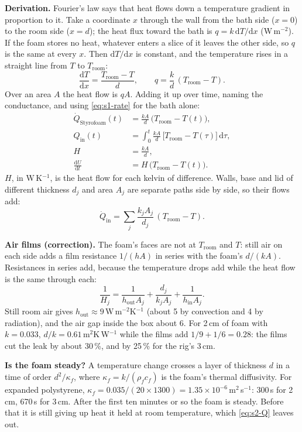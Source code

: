 \documentclass[11pt,a4paper]{article}
\newcommand{\dd}{\mathrm{d}}
\newcommand{\Troom}{T_{\mathrm{room}}}
\newcommand{\para}[1]{\par\smallskip\noindent\textbf{#1}\enspace}
\begin{document}
\para{Derivation.} Fourier's law says that heat flows down a temperature gradient in proportion to it.
Take a coordinate $x$ through the wall from the bath side ($x = 0$) to the room side ($x = d$); the heat
flux toward the bath is $q = k\,\dd T/\dd x$ (W\,m$^{-2}$). If the foam stores no heat, whatever enters a
slice of it leaves the other side, so $q$ is the same at every $x$. Then $\dd T/\dd x$ is constant, and the
temperature rises in a straight line from $T$ to $\Troom$:
\[
\frac{\dd T}{\dd x} = \frac{\Troom - T}{d}, \qquad q = \frac{k}{d}\,(\Troom - T).
\]
Over an area $A$ the heat flow is $qA$. Adding it up over time, naming the conductance, and using
\eqref{eq:s1-rate} for the bath alone:
\begin{align}
\dot Q_{\mathrm{Styrofoam}}(t) &= \frac{kA}{d}\,\big(\Troom - T(t)\big), \label{eq:s2-Q}\\
Q_{\mathrm{in}}(t) &= \int_0^t \frac{kA}{d}\,\big[\Troom - T(\tau)\big]\,\dd\tau, \label{eq:s2-Qint}\\
H &= \frac{kA}{d}, \label{eq:s2-H}\\
\frac{\dd U}{\dd t} &= H\,\big(\Troom - T(t)\big). \label{eq:s2-dU}
\end{align}
$H$, in W\,K$^{-1}$, is the heat flow for each kelvin of difference. Walls, base and lid of different
thickness $d_j$ and area $A_j$ are separate paths side by side, so their flows add:
\begin{equation}
\dot Q_{\mathrm{in}} = \sum_j \frac{k_jA_j}{d_j}\,(\Troom - T). \label{eq:s2-sum}
\end{equation}

\para{Air films (correction).} The foam's faces are not at $\Troom$ and $T$: still air on each side adds a
film resistance $1/(hA)$ in series with the foam's $d/(kA)$. Resistances in series add, because the
temperature drops add while the heat flow is the same through each:
\begin{equation}
\frac{1}{H_j} = \frac{1}{h_{\mathrm{out}}A_j} + \frac{d_j}{k_jA_j} + \frac{1}{h_{\mathrm{in}}A_j}. \label{eq:s2-films}
\end{equation}
Still room air gives $h_{\mathrm{out}} \approx 9$\,W\,m$^{-2}$K$^{-1}$ (about 5 by convection and 4 by
radiation), and the air gap inside the box about 6. For 2\,cm of foam with $k = 0.033$, $d/k = 0.61$\,m$^2$K\,W$^{-1}$
while the films add $1/9 + 1/6 = 0.28$: the films cut the leak by about 30\,\%, and by 25\,\% for the rig's
3\,cm.

\para{Is the foam steady?} A temperature change crosses a layer of thickness $d$ in a time of order
$d^2/\kappa_f$, where $\kappa_f = k/(\rho_fc_f)$ is the foam's thermal diffusivity. For expanded polystyrene,
$\kappa_f = 0.035/(20\times1300) = 1.35\times10^{-6}$\,m$^2$\,s$^{-1}$: 300\,s for 2\,cm, 670\,s for 3\,cm.
After the first ten minutes or so the foam is steady. Before that it is still giving up heat it held at
room temperature, which \eqref{eq:s2-Q} leaves out.
\end{document}
